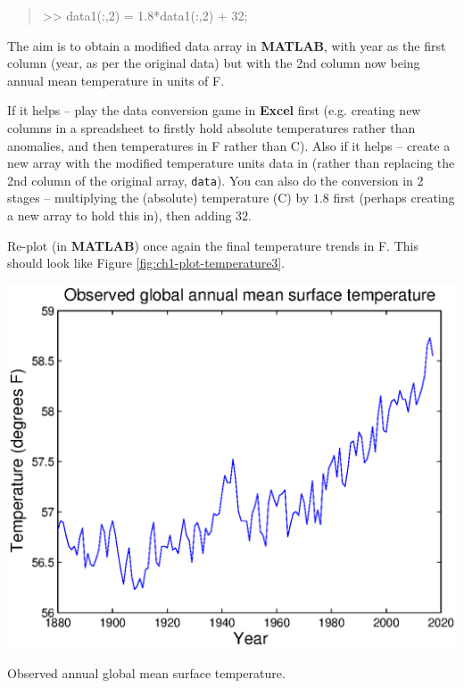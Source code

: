 \documentclass{tufte-book} %
\newenvironment{docspec}{\begin{quotation}\ttfamily\parskip0pt\parindent0pt\ignorespaces}{\end{quotation}}
\begin{document}
\begin{docspec}
>> data1(:,2) = 1.8*data1(:,2) + 32;
\end{docspec}
 
\noindent The aim is to obtain a modified data array in \textbf{MATLAB}, with year as the first column (year, as per the original data) but with the 2nd  column now being annual mean  temperature in units of \degree F.

If it helps -- play  the data conversion game in \textbf{Excel} first (e.g. creating new columns in a spreadsheet to firstly hold  absolute temperatures rather than anomalies, and then temperatures in \degree F rather than \degree C). Also if it helps -- create a new array with the modified temperature units data in (rather than replacing the 2nd column of  the original array, \texttt{data}). You can also do the conversion in 2 stages -- multiplying the (absolute) temperature (\degree C) by \(1.8\) first (perhaps creating a new array to hold this in), then adding \(32\).

Re-plot (in \textbf{MATLAB}) once again the final temperature trends in \degree F. This should look like Figure \ref{fig:ch1-plot-temperature3}.

\begin{marginfigure}[-2.0in]
\includegraphics[width=\linewidth]{ch1-plot-temperature3.eps}
\caption{Observed annual global mean surface temperature.}
\label{fig:ch1-plot-temperature3}
\end{marginfigure}

\end{document}
